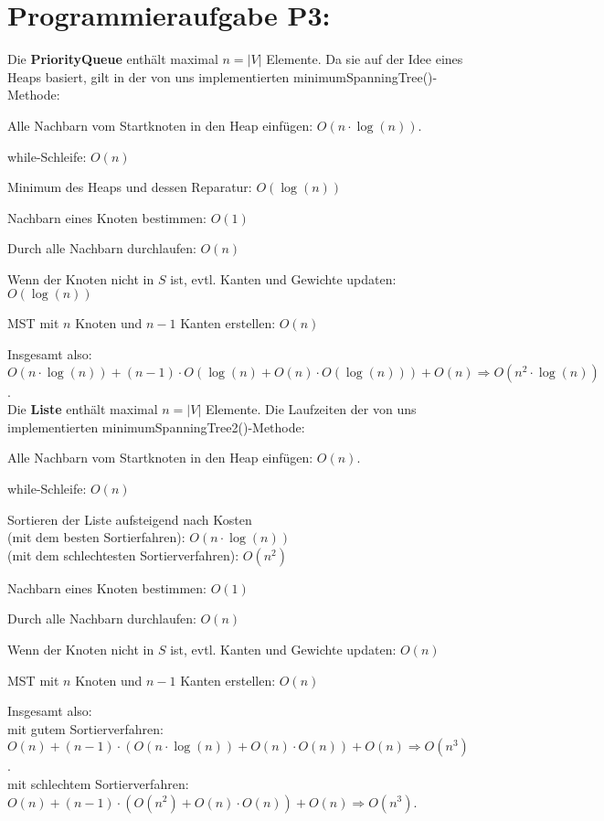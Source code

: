 \documentclass[11pt]{scrartcl} %
\begin{document}
\section*{Programmieraufgabe P3:}
Die \textbf{PriorityQueue} enthält maximal $n = |V|$ Elemente. Da sie auf der Idee eines Heaps basiert, gilt in der von uns implementierten minimumSpanningTree()-Methode: 

\begin{compactenum}[(1)]
\item Alle Nachbarn vom Startknoten in den Heap einfügen: $O(n \cdot \log (n))$.
\item while-Schleife: $O(n)$ 
\begin{compactenum}[(a)]
\item Minimum des Heaps und dessen Reparatur: $O(\log(n))$
\item Nachbarn eines Knoten bestimmen: $O(1)$
\item Durch alle Nachbarn durchlaufen: $O(n)$
\item Wenn der Knoten nicht in $S$ ist, evtl. Kanten und Gewichte updaten: $O(\log(n))$
\end{compactenum}
\item MST mit $n$ Knoten und $n-1$ Kanten erstellen: $O(n)$
\end{compactenum}
Insgesamt also: $O(n\cdot \log(n)) + (n-1)\cdot O( \log(n) + O(n) \cdot O(\log (n))) + O(n) \Rightarrow O(n^2 \cdot \log (n))$.\\[1.0em]
Die \textbf{Liste} enthält maximal $n = |V|$ Elemente. Die Laufzeiten der von uns implementierten minimumSpanningTree2()-Methode: 

\begin{compactenum}[(1)]
\item Alle Nachbarn vom Startknoten in den Heap einfügen: $O(n)$.
\item while-Schleife: $O(n)$ 
\begin{compactenum}[(a)]
\item Sortieren der Liste aufsteigend nach Kosten \\
	(mit dem besten Sortierfahren): $O(n\cdot \log(n))$\\
	(mit dem schlechtesten Sortierverfahren): $O(n^2)$
\item Nachbarn eines Knoten bestimmen: $O(1)$
\item Durch alle Nachbarn durchlaufen: $O(n)$
\item Wenn der Knoten nicht in $S$ ist, evtl. Kanten und Gewichte updaten: $O(n)$
\end{compactenum}
\item MST mit $n$ Knoten und $n-1$ Kanten erstellen: $O(n)$
\end{compactenum}
Insgesamt also:\\
mit gutem Sortierverfahren: $O(n) + (n-1)\cdot(O( n\cdot \log(n)) + O(n) \cdot O(n)) + O(n) \Rightarrow O(n^3)$.\\
mit schlechtem Sortierverfahren: $O(n) + (n-1)\cdot (O( n^2 )+ O(n) \cdot O(n)) + O(n) \Rightarrow O(n^3)$.
\end{document}
